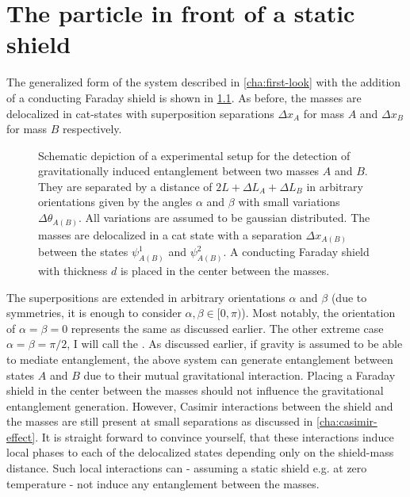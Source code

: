 \chapter{The particle in front of a static shield}\label{cha:entanglement-generation}

The generalized form of the system described in \cref{cha:first-look} with the addition of a conducting Faraday shield is shown in \cref{fig:4:complete-setup}. As before, the masses are delocalized in cat-states with superposition separations $\Delta x_A$ for mass $A$ and $\Delta x_B$ for mass $B$ respectively.
\begin{figure}[!htbp]
  \centering
  \def\svgwidth{\textwidth}
  
  \caption{Schematic depiction of a experimental setup for the detection of gravitationally induced entanglement between two masses $A$ and $B$. They are separated by a distance of $2L + \Delta L_A + \Delta L_B$ in arbitrary orientations given by the angles $\alpha$ and $\beta$ with small variations $\Delta \theta_{A(B)}$. All variations are assumed to be gaussian distributed. The masses are delocalized in a cat state with a separation $\Delta x_{A(B)}$ between the states $\psi_{A(B)}^1$ and $\psi_{A(B)}^2$. A conducting Faraday shield with thickness $d$ is placed in the center between the masses.}
  \label{fig:4:complete-setup}
\end{figure}
The superpositions are extended in arbitrary orientations $\alpha$ and $\beta$ (due to symmetries, it is enough to consider $\alpha, \beta \in [0, \pi)$). Most notably, the orientation of $\alpha = \beta = 0$ represents the same  as discussed earlier. The other extreme case $\alpha = \beta = \pi/2$, I will call the .
As discussed earlier, if gravity is assumed to be able to mediate entanglement, the above system can generate entanglement between states $A$ and $B$ due to their mutual gravitational interaction.
Placing a Faraday shield in the center between the masses should not influence the gravitational entanglement generation.
However, Casimir interactions between the shield and the masses are still present at small separations as discussed in \cref{cha:casimir-effect}.
It is straight forward to convince yourself, that these interactions induce local phases to each of the delocalized states depending only on the shield-mass distance.
Such local interactions can - assuming a static shield e.g. at zero temperature - not induce any entanglement between the masses.

